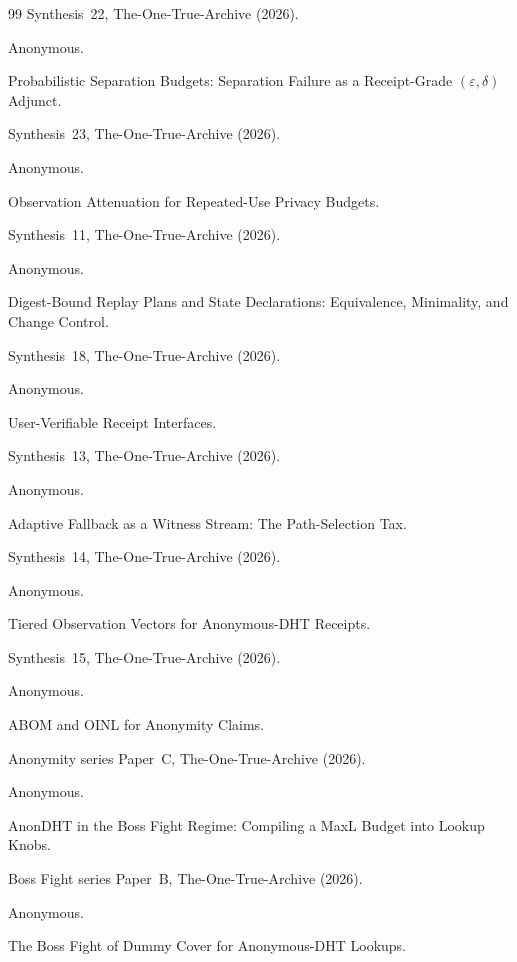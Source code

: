 \documentclass[11pt]{article}
\begin{document}
\begin{thebibliography}{99}
\newblock Synthesis~22, The-One-True-Archive (2026).

Anonymous.

\newblock Probabilistic Separation Budgets: Separation Failure as a Receipt-Grade $(\varepsilon,\delta)$ Adjunct.

\newblock Synthesis~23, The-One-True-Archive (2026).

Anonymous.

\newblock Observation Attenuation for Repeated-Use Privacy Budgets.

\newblock Synthesis~11, The-One-True-Archive (2026).


Anonymous.

\newblock Digest-Bound Replay Plans and State Declarations: Equivalence, Minimality, and Change Control.

\newblock Synthesis~18, The-One-True-Archive (2026).

Anonymous.

\newblock User-Verifiable Receipt Interfaces.

\newblock Synthesis~13, The-One-True-Archive (2026).

Anonymous.

\newblock Adaptive Fallback as a Witness Stream: The Path-Selection Tax.

\newblock Synthesis~14, The-One-True-Archive (2026).

Anonymous.

\newblock Tiered Observation Vectors for Anonymous-DHT Receipts.

\newblock Synthesis~15, The-One-True-Archive (2026).

Anonymous.

\newblock ABOM and OINL for Anonymity Claims.

\newblock Anonymity series Paper~C, The-One-True-Archive (2026).

Anonymous.

\newblock AnonDHT in the Boss Fight Regime: Compiling a MaxL Budget into Lookup Knobs.

\newblock Boss Fight series Paper~B, The-One-True-Archive (2026).


Anonymous.

\newblock The Boss Fight of Dummy Cover for Anonymous-DHT Lookups.


\end{thebibliography}
\end{document}
